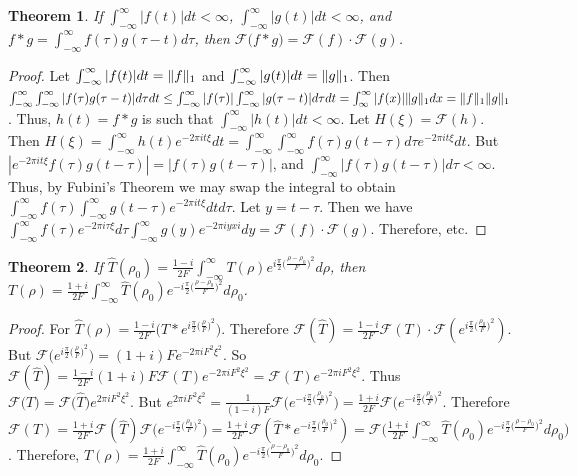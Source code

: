 \documentclass[oneside]{book}
\theoremstyle{mystyle}
\newtheorem{theorem}{Theorem}[section]
\DeclarePairedDelimiter\norm{\lVert}{\rVert}
\begin{document}
\begin{theorem}
If $\int_{-\infty}^{\infty} |f(t)|dt < \infty$, $\int_{-\infty}^{\infty} |g(t)|dt < \infty$, and $f* g = \int_{-\infty}^{\infty} f(\tau)g(\tau-t)d\tau$, then $\mathcal{F}\big(f * g\big) = \mathcal{F}(f)\cdot \mathcal{F}(g)$.
\end{theorem}
\begin{proof}
Let $\int_{-\infty}^{\infty} |f(t)|dt = \norm{f}_{1}$ and $\int_{-\infty}^{\infty} |g(t)|dt = \norm{g}_{1}$. Then $\int_{-\infty}^{\infty} \int_{-\infty}^{\infty} |f(\tau)g(\tau-t)|d\tau dt \leq \int_{-\infty}^{\infty} |f(\tau)| \int_{-\infty}^{\infty} |g(\tau-t)|d\tau dt = \int_{\infty}^{\infty}|f(x)|\norm{g}_{1}dx = \norm{f}_{1}\norm{g}_{1}$. Thus, $h(t) = f* g$ is such that $\int_{-\infty}^{\infty} |h(t)|dt < \infty$. Let $H(\xi) = \mathcal{F}(h)$. Then $H(\xi) = \int_{-\infty}^{\infty} h(t)e^{-2\pi i t \xi}dt = \int_{-\infty}^{\infty} \int_{-\infty}^{\infty} f(\tau)g(t-\tau)d\tau e^{-2\pi i t\xi}dt$. But $|e^{-2\pi i t \xi}f(\tau)g(t-\tau)| = |f(\tau)g(t-\tau)|$, and $\int_{-\infty}^{\infty}|f(\tau)g(t-\tau)|d\tau < \infty$. Thus, by Fubini's Theorem we may swap the integral to obtain $\int_{-\infty}^{\infty} f(\tau)\int_{-\infty}^{\infty}g(t-\tau)e^{-2\pi i t\xi}dtd\tau$. Let $y = t-\tau$. Then we have $\int_{-\infty}^{\infty} f(\tau)e^{-2\pi i \tau \xi}d\tau \int_{-\infty}^{\infty}g(y) e^{-2\pi i y xi}dy = \mathcal{F}(f) \cdot \mathcal{F}(g)$. Therefore, etc.
\end{proof}

\begin{theorem}
If $\hat{T}(\rho_0) = \frac{1-i}{2F}\int_{-\infty}^{\infty}T(\rho) e^{i\frac{\pi}{2}\big(\frac{\rho-\rho_0}{F}\big)^2}d\rho$, then $T(\rho) = \frac{1+i}{2F}\int_{-\infty}^{\infty}\hat{T}(\rho_0)e^{-i\frac{\pi}{2}\big(\frac{\rho-\rho_0}{F}\big)^2}d\rho_0$.
\end{theorem}
\begin{proof}
For $\hat{T}(\rho) = \frac{1-i}{2F}(T* e^{i \frac{\pi}{2}\big(\frac{\rho}{F}\big)^2}\big)$. Therefore $\mathcal{F}(\hat{T}) = \frac{1-i}{2F}\mathcal{F}(T)\cdot \mathcal{F}(e^{i\frac{\pi}{2}\big(\frac{\rho_0}{F}\big)^2})$. But $\mathcal{F}\big(e^{i\frac{\pi}{2}\big(\frac{\rho}{F}\big)^2}\big) = (1+i)Fe^{-2\pi i F^2 \xi^2}$. So $\mathcal{F}(\hat{T}) =\frac{1-i}{2F}(1+i)F \mathcal{F}(T) e^{-2\pi i F^2 \xi^2} = \mathcal{F}(T)e^{-2\pi i F^2 \xi^2}$. Thus $\mathcal{F
}\big(T\big) = \mathcal{F}\big(\hat{T}\big)e^{2\pi i F^2 \xi^2}$. But $e^{2\pi i F^2 \xi^2} = \frac{1}{(1-i)F}\mathcal{F}\big(e^{-i\frac{\pi}{2}\big(\frac{\rho_0}{F}\big)^2}\big) = \frac{1+i}{2F} \mathcal{F}\big(e^{-i\frac{\pi}{2}\big(\frac{\rho_0}{F}\big)^2}$. Therefore $\mathcal{F}(T) = \frac{1+i}{2F}\mathcal{F}(\hat{T})\mathcal{F}\big(e^{-i\frac{\pi}{2}\big(\frac{\rho_0}{F}\big)^2}\big) = \frac{1+i}{2F}\mathcal{F}(\hat{T}* e^{-i\frac{\pi}{2}\big(\frac{\rho_0}{F}\big)^2}) = \mathcal{F}\bigg(\frac{1+i}{2F}\int_{-\infty}^{\infty} \hat{T}(\rho_0)e^{-i\frac{\pi}{2}\big(\frac{\rho - \rho_0}{F}\big)^2} d\rho_0\bigg)$. Therefore, $T(\rho) = \frac{1+i}{2F}\int_{-\infty}^{\infty}\hat{T}(\rho_0)e^{-i\frac{\pi}{2}\big(\frac{\rho - \rho_0}{F}\big)^2}d\rho_0$.
\end{proof}
\end{document}
